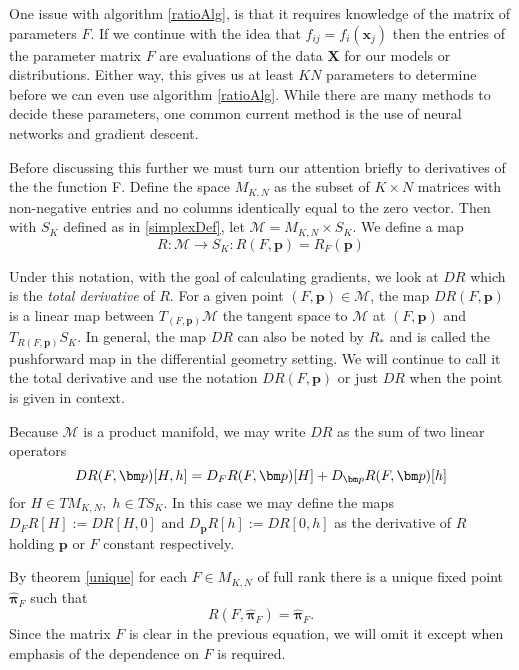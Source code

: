 One issue with algorithm \ref{ratioAlg}, is that it requires knowledge of the matrix of parameters $F$.  If we continue with the idea that $f_{ij}=f_i(\bm x_j)$ then the entries of the parameter matrix $F$ are evaluations of the data $\bm X$ for our models or distributions. Either way, this gives us at least $KN$ parameters to determine before we can even use algorithm \ref{ratioAlg}.  While there are many methods to decide these parameters, one common current method is the use of neural networks and gradient descent.

Before discussing this further we must turn our attention briefly to derivatives of the the function \Rpi F.  Define the space $M_{K,N}$
 as the subset of $K\times N$ matrices with non-negative entries and no columns identically equal to the zero vector.  Then with $S_K$ defined
 as in \ref{simplexDef}, let $\mathcal{M}=M_{K,N}\times S_K$. We define a map
\begin{equation}\label{manifoldResp}
R:\mathcal{M}\rightarrow S_K:R(F,\bm p) = R_F(\bm p)
\end{equation}

Under this notation, with the goal of calculating gradients, we look at $DR$  which is the \textit{total derivative} of $R$.  For a given point $(F,\bm p)\in \mathcal{M}$, the map $DR(F,\bm p)$ is a linear map between $T_{(F,\bm p)}\mathcal{M}$ the tangent space to $\mathcal{M}$ at $(F,\bm p)$ and $T_{R(F,\bm p)}S_K$.  In general, the map $DR$ can also be noted by $R_*$ and is called the pushforward map in the differential geometry setting.  We will continue to call it the total derivative and use the notation $DR(F,\bm p)$ or just $DR$ when the point is given in context.

Because $\mathcal{M}$ is a product manifold, we may write $DR$ as the sum of two linear operators
\begin{equation*}
DR(F,\bm p)[H,h] = D_FR(F,\bm p)[H] + D_{\bm p}R(F,\bm p)[h]  \\
\end{equation*}
for \( H\in TM_{K,N},\; h\in TS_K\). In this case we may define the maps $D_FR[H]:=DR[H,0]$ and $D_{\bm p}R[h]:=DR[0,h]$ as the derivative of $R$ holding $\bm p$ or $F$ constant respectively.

By theorem \ref{unique} for each $F\in M_{K,N}$ of full rank there is a unique fixed point $\hat{\bm \pi}_F$ such that 
\begin{equation}\label{pisubF}
R(F,\hat{\bm \pi}_F)=\hat{\bm \pi}_F.
\end{equation}
Since the matrix $F$ is clear in the previous equation, we will omit it except when emphasis of the dependence on $F$ is required.


